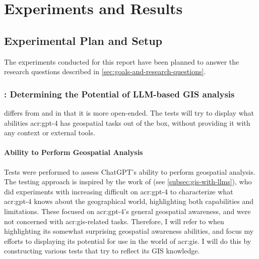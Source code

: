 \chapter{Experiments and Results}
\label{cha:experiments}

\section{Experimental Plan and Setup}
\label{sec:experimental-plan-and-setup}

The experiments conducted for this report have been planned to answer the research questions described in \autoref{sec:goals-and-research-questions}.

\subsection[RQ1: Determining the Potential of LLM-based GIS analysis]{: Determining the Potential of LLM-based GIS analysis}

 differs from  and  in that it is more open-ended. The tests will try to display what abilities \acrshort{acr:gpt}-4 has geospatial tasks out of the box, without providing it with any context or external tools.

\subsubsection{Ability to Perform Geospatial Analysis}

Tests were performed to assess ChatGPT's ability to perform geospatial analysis. The testing approach is inspired by the work of \cite{robertsGPT4GEOHowLanguage2023} (see \autoref{subsec:gis-with-llms}), who did experiments with increasing difficult on \acrshort{acr:gpt}-4 to characterize what \acrshort{acr:gpt}-4 knows about the geographical world, highlighting both capabilities and limitations. These focused on \acrshort{acr:gpt}-4's general geospatial awareness, and were not concerned with \acrshort{acr:gis}-related tasks. Therefore, I will refer to \cite{robertsGPT4GEOHowLanguage2023} when highlighting its somewhat surprising geospatial awareness abilities, and focus my efforts to displaying its potential for use in the world of \acrshort{acr:gis}. I will do this by constructing various tests that try to reflect its GIS knowledge.

